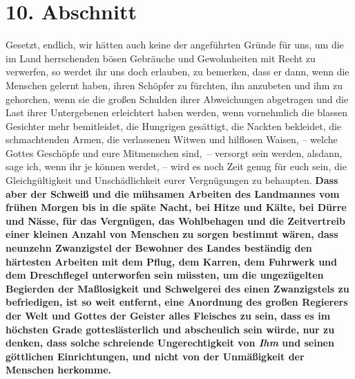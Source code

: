 \section{10. Abschnitt} \label{kap18_ab10}

Gesetzt, endlich, wir hätten auch keine der angeführten Gründe für uns, um die
im Land herrschenden bösen Gebräuche und Gewohnheiten mit Recht zu verwerfen,
so werdet ihr uns doch erlauben, zu bemerken, dass er dann, wenn die Menschen
gelernt haben, ihren Schöpfer zu fürchten, ihn anzubeten und ihm zu
gehorchen, wenn sie die großen Schulden ihrer Abweichungen abgetragen und die
Last ihrer Untergebenen erleichtert haben werden, wenn vornehmlich die blassen
Gesichter mehr bemitleidet, die Hungrigen gesättigt, die Nackten bekleidet, die
schmachtenden Armen, die verlassenen Witwen und hilflosen Waisen, -- welche
Gottes Geschöpfe und eure Mitmenschen sind,~-- versorgt sein werden, alsdann,
sage ich, wenn ihr je können werdet, -- wird es noch Zeit genug für euch sein,
die Gleichgültigkeit und Unschädlichkeit eurer Vergnügungen zu
behaupten.
\label{ref:18_10_ungeraechtikeit} \textbf{Dass aber der Schweiß und die mühsamen
Arbeiten
des Landmannes vom frühen Morgen bis in die späte Nacht, bei Hitze und Kälte,
bei Dürre und Nässe, für das Vergnügen, das Wohlbehagen und die Zeitvertreib
einer kleinen Anzahl von Menschen zu sorgen bestimmt wären, dass neunzehn
Zwanzigstel der Bewohner
des Landes beständig den härtesten Arbeiten mit dem
Pflug, dem Karren, dem Fuhrwerk und dem Dreschflegel unterworfen sein müssten,
um
die ungezügelten Begierden der Maßlosigkeit und Schwelgerei des
einen Zwanzigstels
zu befriedigen, ist so weit entfernt, eine Anordnung des großen Regierers der
Welt und Gottes der Geister alles Fleisches zu sein, dass es im höchsten Grade
gotteslästerlich und abscheulich sein würde, nur zu denken, dass solche
schreiende Ungerechtigkeit von \textit{Ihm} und seinen göttlichen Einrichtungen,
und
nicht von der Unmäßigkeit der Menschen herkomme.}
